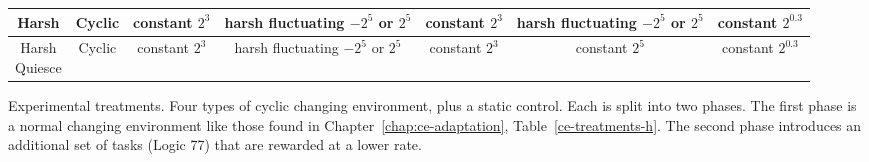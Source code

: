 \documentclass[PhD]{msu-thesis}
\begin{document}
\begin{table}[]
\begin{tabular}{|c|c||c|c||c|c|c|}
	Harsh & Cyclic & \makecell{constant \\ $2^3$} & \makecell{harsh \\ fluctuating \\ $-2^5$ or $2^5$} & \makecell{constant \\ $2^3$} & \makecell{harsh \\ fluctuating \\ $-2^5$ or $2^5$} & \makecell{constant \\ $2^{0.3}$} \\\hline
	\makecell{Harsh \\ Quiesce} & Cyclic & \makecell{constant \\ $2^3$} & \makecell{harsh \\ fluctuating \\ $-2^5$ or $2^5$} & \makecell{constant \\ $2^3$} & \makecell{constant \\ $2^5$} & \makecell{constant \\ $2^{0.3}$} \\\hline
	\end{tabular} 

	\begin{flushleft} Experimental treatments. Four types of cyclic changing environment, plus a static control. Each is split into two phases. The first phase is a normal changing environment like those found in Chapter~\ref{chap:ce-adaptation}, Table~\ref{ce-treatments-h}. The second phase introduces an additional set of tasks (Logic 77) that are rewarded at a lower rate.
	\end{flushleft}
	\label{cel-treatments}
	\end{table}
\end{document}
